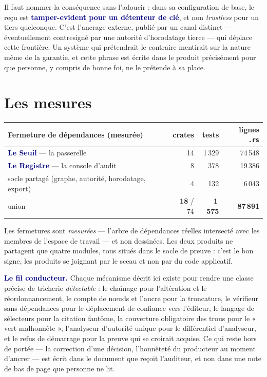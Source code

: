 \documentclass[10pt]{article}
\newcommand{\code}[1]{\texttt{\small #1}}
\newcommand{\mm}[1]{\textbf{\textcolor{navy}{#1}}}
\begin{document}
Il faut nommer la conséquence sans l'adoucir : dans sa configuration de base, le reçu est \mm{tamper-evident pour un détenteur de clé}, et non \emph{trustless} pour un tiers quelconque. C'est l'ancrage externe, publié par un canal distinct — éventuellement contresigné par une autorité d'horodatage tierce — qui déplace cette frontière. Un système qui prétendrait le contraire mentirait sur la nature même de la garantie, et cette phrase est écrite dans le produit précisément pour que personne, y compris de bonne foi, ne le prétende à sa place.

\section{Les mesures}

\begin{center}\small
\begin{tabular}{@{}l r r r@{}}
\toprule
Fermeture de dépendances (mesurée) & crates & tests & lignes \code{.rs}\\
\midrule
\mm{Le Seuil} — la passerelle & 14 & 1\,329 & 74\,548\\
\mm{Le Registre} — la console d'audit & 8 & 378 & 19\,386\\
socle partagé (graphe, autorité, horodatage, export) & 4 & 132 & 6\,043\\
\midrule
union & \textbf{18} / 74 & \textbf{1\,575} & \textbf{87\,891}\\
\bottomrule
\end{tabular}
\end{center}

Les fermetures sont \emph{mesurées} — l'arbre de dépendances réelles intersecté avec les membres de l'espace de travail — et non dessinées. Les deux produits ne partagent que quatre modules, tous situés dans le socle de preuve : c'est le bon signe, les produits se joignant par le sceau et non par du code applicatif.

\begin{these}
\mm{Le fil conducteur.} Chaque mécanisme décrit ici existe pour rendre une classe précise de tricherie \emph{détectable} : le chaînage pour l'altération et le réordonnancement, le compte de nœuds et l'ancre pour la troncature, le vérifieur sans dépendances pour le déplacement de confiance vers l'éditeur, le langage de sélecteurs pour la citation fantôme, la couverture obligatoire des trous pour le « vert malhonnête », l'analyseur d'autorité unique pour le différentiel d'analyseur, et le refus de démarrage pour la preuve qui se croirait acquise. Ce qui reste hors de portée — la correction d'une décision, l'honnêteté du producteur au moment d'ancrer — est écrit dans le document que reçoit l'auditeur, et non dans une note de bas de page que personne ne lit.
\end{these}
\end{document}
